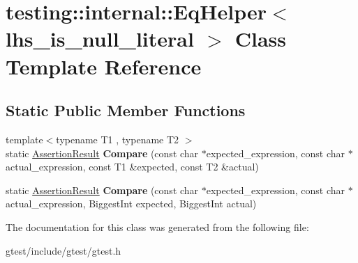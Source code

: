 \hypertarget{classtesting_1_1internal_1_1EqHelper}{}\section{testing\+:\+:internal\+:\+:Eq\+Helper$<$ lhs\+\_\+is\+\_\+null\+\_\+literal $>$ Class Template Reference}
\label{classtesting_1_1internal_1_1EqHelper}
\subsection*{Static Public Member Functions}
\begin{DoxyCompactItemize}
\item 
\mbox{\label{classtesting_1_1internal_1_1EqHelper_ac2977ed90cd3c88607f804e43b86b92c}} 
{\footnotesize template$<$typename T1 , typename T2 $>$ }\\static \hyperlink{classtesting_1_1AssertionResult}{Assertion\+Result} {\bfseries Compare} (const char $\ast$expected\+\_\+expression, const char $\ast$actual\+\_\+expression, const T1 \&expected, const T2 \&actual)
\item 
\mbox{\label{classtesting_1_1internal_1_1EqHelper_a3de996954b41d484c065ed824fe7eac9}} 
static \hyperlink{classtesting_1_1AssertionResult}{Assertion\+Result} {\bfseries Compare} (const char $\ast$expected\+\_\+expression, const char $\ast$actual\+\_\+expression, Biggest\+Int expected, Biggest\+Int actual)
\end{DoxyCompactItemize}


The documentation for this class was generated from the following file\+:\begin{DoxyCompactItemize}
\item 
gtest/include/gtest/gtest.\+h\end{DoxyCompactItemize}
